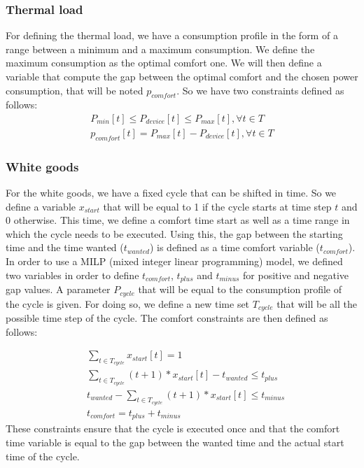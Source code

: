 \subsubsection{Thermal load}

For defining the thermal load, we have a consumption profile in the form of a range between a minimum and a maximum consumption. We define the maximum consumption as the optimal comfort one. We will then define a variable that compute the gap between the optimal comfort and the chosen power consumption, that will be noted $p_{comfort}$. So we have two constraints defined as follows:
\begin{align} 
    P_{min}[t] \leq P_{device}[t] \leq P_{max}[t], \forall t \in T \\
    p_{comfort}[t] = P_{max}[t] - P_{device}[t], \forall t \in T
\end{align}

\subsubsection{White goods}

For the white goods, we have a fixed cycle that can be shifted in time. So we define a variable 
$x_{start}$ that will be equal to 1 if the cycle starts at time step $t$ and 0 otherwise. This time, we define a comfort time start as well as a time range in which the cycle needs to be executed. Using this, the gap between the starting time and the time wanted ($t_{wanted}$) is defined as a time comfort variable ($t_{comfort}$). In order to use a MILP (mixed integer linear programming) model, we defined two variables in order to define 
$t_{comfort}$, $t_{plus}$ and $t_{minus}$ for positive and negative gap values. 
A parameter $P_{cycle}$ that will be equal to the consumption profile of the cycle is given. For doing so, we define a new time set $T_{cycle}$ that will be all the possible time step of the cycle. The comfort constraints are then defined as follows:


\begin{align}
    &\sum_{t \in T_{cycle}} x_{start}[t] = 1 \\
    &\sum_{t \in T_{cycle}} (t+1) * x_{start}[t] - t_{wanted} \leq t_{plus} \\
    &t_{wanted} - \sum_{t \in T_{cycle}} (t+1) * x_{start}[t] \leq t_{minus} \\
    &t_{comfort} = t_{plus} + t_{minus} 
\end{align}
These constraints ensure that the cycle is executed once and that the comfort time variable is equal to the gap between the wanted time and the actual start time of the cycle.


